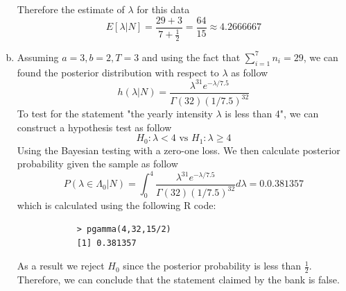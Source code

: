 \documentclass[a4paper,11pt]{article}
\begin{document}
\begin{enumerate}[(a)]
			Therefore the estimate of $\lambda$ for this data
			\[
				E[\lambda|N] = \frac{29+3}{7+\frac{1}{2}} = \frac{64}{15} \approx 4.2666667
			\]
		\item
			Assuming $a=3, b=2,T=3$ and using the fact that $\sum^7_{i=1}n_i = 29$, we can found the posterior distribution with respect to $\lambda$ as follow 
			\[
				h(\lambda|N) = \frac{\lambda^{31}e^{-\lambda/7.5}}{\Gamma(32)(1/7.5)^{32}}
			\]
		To test for the statement "the yearly intensity $\lambda$ is less than 4", we can construct a hypothesis test as follow
		\[
		H_0:\lambda <4 \mbox{ vs } H_1: \lambda \ge 4
		\]
		Using the Bayesian testing with a zero-one loss. We then calculate posterior probability given the sample as follow
		\[
		P(\lambda \in \Lambda_0 | N) = \int^4_0 \frac{\lambda^{31}e^{-\lambda/7.5}}{\Gamma(32)(1/7.5)^{32}} d\lambda= 0.0.381357
		\]
		which is calculated using the following R code:
		\begin{verbatim} 
			> pgamma(4,32,15/2)
			[1] 0.381357
		\end{verbatim} 
		As a result we reject $H_0$ since the posterior probability is less than $\frac{1}{2}$. Therefore, we can conclude that the statement claimed by the bank is false. 
	\end{enumerate}
	\newpage
\end{document}
